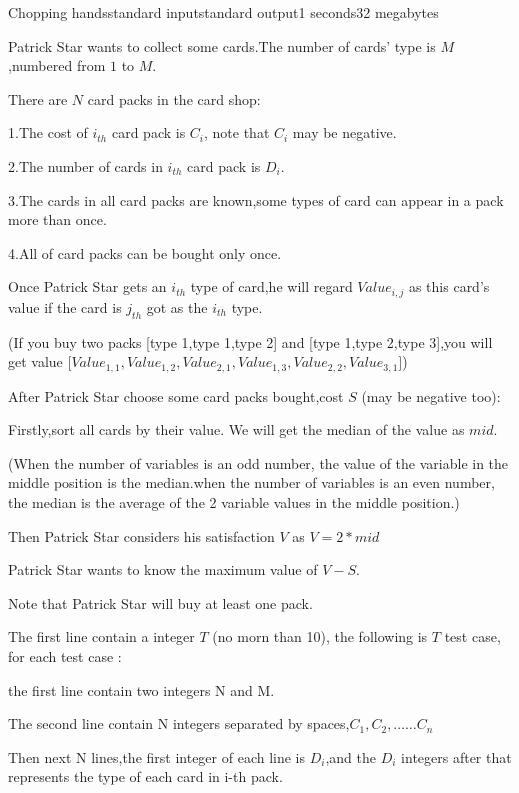 \begin{problem}{Chopping hands}{standard input}{standard output}{1 seconds}{32 megabytes}

Patrick Star wants to collect some cards.The number of cards' type is $ M $,numbered from $ 1 $ to $ M $.

There are $ N $ card packs in the card shop:

1.The cost of $i_{th}$ card pack is $ C_{i} $, note that $ C_{i} $ may be negative.

2.The number of cards in $i_{th}$ card pack is $ D_{i} $.

3.The cards in all card packs are known,some types of card can appear in a pack more than once.

4.All of card packs can be bought only once.

Once Patrick Star gets an $ i_{th} $ type of card,he will regard $ Value_{i,j} $ as this card's value if the card is $j_{th}$ got as the $i_{th}$ type.

(If you buy two packs [type 1,type 1,type 2] and [type 1,type 2,type 3],you will get value [$Value_{1,1}, Value_{1,2}, Value_{2,1}, Value_{1,3}, Value_{2,2}, Value_{3,1}]$)

After Patrick Star choose some card packs bought,cost $ S $ (may be negative too):

Firstly,sort all cards by their value. We will get the median of the value as $ mid $.

(When the number of variables is an odd number, the value of the variable in the middle position is the median.when the number of variables is an even number, the median is the average of the 2 variable values in the middle position.)

Then Patrick Star considers his satisfaction $ V $ as $ V = 2 * mid $

Patrick Star wants to know the maximum value of $ V - S $.

Note that Patrick Star will buy at least one pack.


\InputFile
The first line contain a integer $T$ (no morn than 10), the following is $T$ test case, for each test case :

the first line contain two integers N and M.

The second line contain N integers separated by spaces,$ C_{1},C_{2},……C_{n} $

Then next N lines,the first integer of each line is $ D_{i} $,and the $ D_{i} $ integers after that represents the type of each card in i-th pack.


\end{problem}
